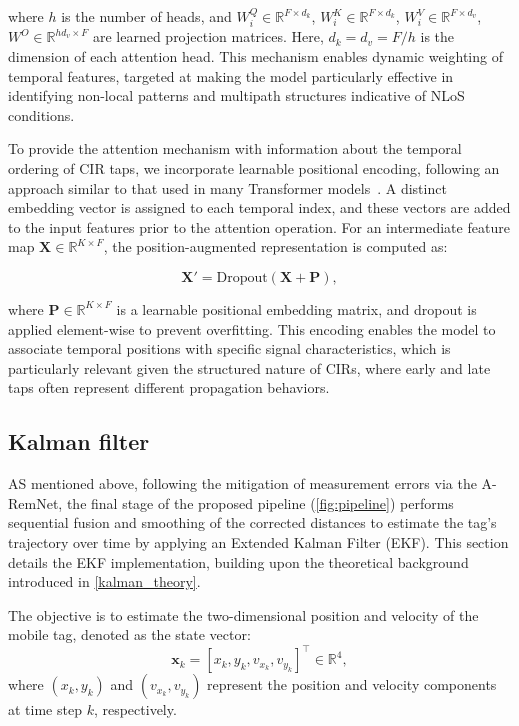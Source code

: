 where $h$ is the number of heads, and $W_i^Q \in \mathbb{R}^{F \times d_k}$, $W_i^K \in \mathbb{R}^{F \times d_k}$, $W_i^V \in \mathbb{R}^{F \times d_v}$, $W^O \in \mathbb{R}^{hd_v \times F}$ are learned projection matrices. Here, $d_k = d_v = F/h$ is the dimension of each attention head. This mechanism enables dynamic weighting of temporal features, targeted at making the model particularly effective in identifying non-local patterns and multipath structures indicative of NLoS conditions.

To provide the attention mechanism with information about the temporal ordering of CIR taps, we incorporate learnable positional encoding, following an approach similar to that used in many Transformer models~\cite{2019-bert, 2022-simple-yet}. A distinct embedding vector is assigned to each temporal index, and these vectors are added to the input features prior to the attention operation. For an intermediate feature map $\mathbf{X} \in \mathbb{R}^{K \times F}$, the position-augmented representation is computed as:

\begin{equation}
    \mathbf{X}' = \text{Dropout}(\mathbf{X} + \mathbf{P}),
\end{equation}

where $\mathbf{P} \in \mathbb{R}^{K \times F}$ is a learnable positional embedding matrix, and dropout is applied element-wise to prevent overfitting. This encoding enables the model to associate temporal positions with specific signal characteristics, which is particularly relevant given the structured nature of CIRs, where early and late taps often represent different propagation behaviors.

\subsection{Kalman filter}

AS mentioned above, following the mitigation of measurement errors via the A-RemNet, the final stage of the proposed pipeline (\autoref{fig:pipeline}) performs sequential fusion and smoothing of the corrected distances to estimate the tag's trajectory over time by applying an Extended Kalman Filter (EKF). This section details the EKF implementation, building upon the theoretical background introduced in \autoref{kalman_theory}.

The objective is to estimate the two-dimensional position and velocity of the mobile tag, denoted as the state vector:
\begin{equation}
        \mathbf{x}_k = [x_k, y_k, v_{x_k}, v_{y_k}]^\top \in \mathbb{R}^4,
\end{equation}
where $(x_k, y_k)$ and $(v_{x_k}, v_{y_k})$ represent the position and velocity components at time step $k$, respectively.

